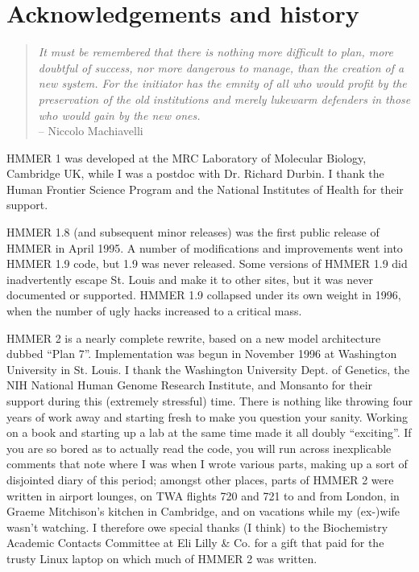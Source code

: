 \chapter {Acknowledgements and history}

\begin{quote}
\textit{
It must be remembered that there is nothing more difficult to plan, more
doubtful of success, nor more dangerous to manage, than the creation of
a new system.  For the initiator has the emnity of all who would profit
by the preservation of the old institutions and merely lukewarm defenders
in those who would gain by the new ones.\\}
\hspace*{\fill} -- Niccolo Machiavelli
\end{quote}

HMMER 1 was developed at the MRC Laboratory of Molecular Biology,
Cambridge UK, while I was a postdoc with Dr. Richard Durbin. I thank
the Human Frontier Science Program and the National Institutes of
Health for their support. 

HMMER 1.8 (and subsequent minor releases) was the first public release
of HMMER in April 1995. A number of modifications and improvements
went into HMMER 1.9 code, but 1.9 was never released. Some versions of
HMMER 1.9 did inadvertently escape St. Louis and make it to other
sites, but it was never documented or supported. HMMER 1.9 collapsed
under its own weight in 1996, when the number of ugly hacks increased
to a critical mass.

HMMER 2 is a nearly complete rewrite, based on a new model
architecture dubbed ``Plan 7''. Implementation was begun in November
1996 at Washington University in St. Louis. I thank the Washington
University Dept. of Genetics, the NIH National Human Genome Research
Institute, and Monsanto for their support during this (extremely
stressful) time. There is nothing like throwing four years of work
away and starting fresh to make you question your sanity. Working on a
book \cite{Durbin98} and starting up a lab at the same time made it
all doubly ``exciting''. If you are so bored as to actually read the
code, you will run across inexplicable comments that note where I was
when I wrote various parts, making up a sort of disjointed diary of
this period; amongst other places, parts of HMMER 2 were written in
airport lounges, on TWA flights 720 and 721 to and from London, in
Graeme Mitchison's kitchen in Cambridge, and on vacations while my
(ex-)wife wasn't watching. I therefore owe special thanks (I think) to
the Biochemistry Academic Contacts Committee at Eli Lilly \& Co. for a
gift that paid for the trusty Linux laptop on which much of HMMER 2
was written.


